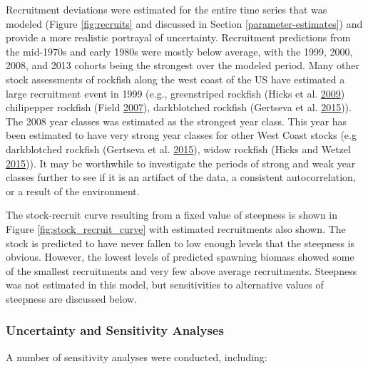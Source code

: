 \documentclass[12pt,]{article}
\begin{document}
Recruitment deviations were estimated for the entire time series that
was modeled (Figure \ref{fig:recruits} and discussed in Section
\ref{parameter-estimates}) and provide a more realistic portrayal of
uncertainty. Recruitment predictions from the mid-1970s and early 1980s
were mostly below average, with the 1999, 2000, 2008, and 2013 cohorts
being the strongest over the modeled period. Many other stock
assessments of rockfish along the west coast of the US have estimated a
large recruitment event in 1999 (e.g., greenstriped rockfish (Hicks et
al. \protect\hyperlink{ref-hicks_status_2009}{2009}) chilipepper
rockfish (Field \protect\hyperlink{ref-field_status_2007}{2007}),
darkblotched rockfish (Gertseva et al.
\protect\hyperlink{ref-gertseva_status_2015}{2015})). The 2008 year
classes was estimated as the strongest year class. This year has been
estimated to have very strong year classes for other West Coast stocks
(e.g darkblotched rockfish (Gertseva et al.
\protect\hyperlink{ref-gertseva_status_2015}{2015}), widow rockfish
(Hicks and Wetzel \protect\hyperlink{ref-hicks_status_2015}{2015})). It
may be worthwhile to investigate the periods of strong and weak year
classes further to see if it is an artifact of the data, a consistent
autocorrelation, or a result of the environment.

The stock-recruit curve resulting from a fixed value of steepness is
shown in Figure \ref{fig:stock_recruit_curve} with estimated
recruitments also shown. The stock is predicted to have never fallen to
low enough levels that the steepness is obvious. However, the lowest
levels of predicted spawning biomass showed some of the smallest
recruitments and very few above average recruitments. Steepness was not
estimated in this model, but sensitivities to alternative values of
steepness are discussed below.

\subsubsection{Uncertainty and Sensitivity
Analyses}\label{uncertainty-and-sensitivity-analyses}

A number of sensitivity analyses were conducted, including:
\end{document}
